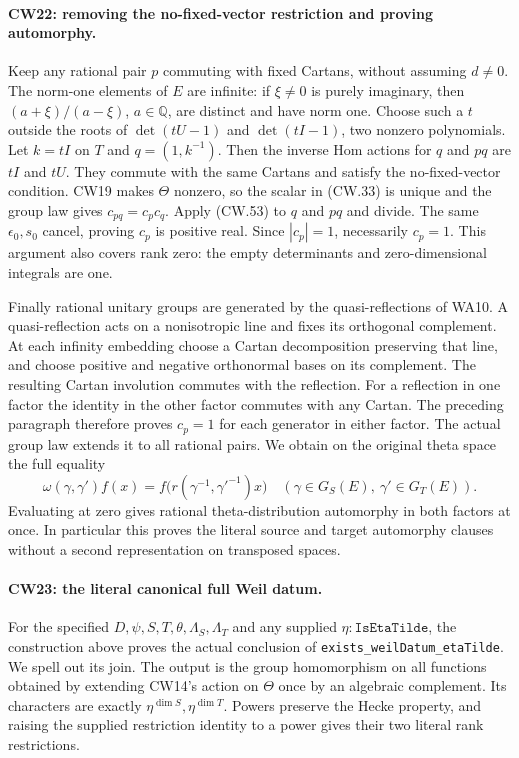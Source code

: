 \paragraph{CW22: removing the no-fixed-vector restriction and proving automorphy.}
Keep any rational pair $p$ commuting with fixed Cartans, without
assuming $d\ne0$.  The norm-one elements of $E$ are infinite:
if $\xi\ne0$ is purely imaginary, then
$(a+\xi)/(a-\xi)$, $a\in\mathbb Q$, are distinct and have norm
one.  Choose such a $t$ outside the roots of
$\det(tU-1)$ and $\det(tI-1)$, two nonzero polynomials.
Let $k=tI$ on $T$ and $q=(1,k^{-1})$.
Then the inverse Hom actions for $q$ and $pq$ are $tI$ and $tU$.
They commute with the same Cartans and satisfy the no-fixed-vector
condition.  CW19 makes $\Theta$ nonzero, so the scalar in (CW.33)
is unique and the group law gives $c_{pq}=c_pc_q$.
Apply (CW.53) to $q$ and $pq$ and divide.  The same
$\epsilon_0,s_0$ cancel, proving $c_p$ is positive real.
Since $|c_p|=1$, necessarily $c_p=1$.
This argument also covers rank zero: the empty determinants and
zero-dimensional integrals are one.

Finally rational unitary groups are generated by the
quasi-reflections of WA10.  A quasi-reflection acts on a
nonisotropic line and fixes its orthogonal complement.
At each infinity embedding choose a Cartan decomposition preserving
that line, and choose positive and negative orthonormal bases on
its complement.  The resulting Cartan involution commutes with
the reflection.  For a reflection in one factor the identity in
the other factor commutes with any Cartan.  The preceding paragraph
therefore proves $c_p=1$ for each generator in either factor.
The actual group law extends it to all rational pairs.  We obtain
on the original theta space the full equality
\[
       \omega(\gamma,\gamma')f(x)
                =f\bigl(r(\gamma^{-1},\gamma'^{-1})x\bigr)
       \quad(\gamma\in G_S(E),\ \gamma'\in G_T(E)).     \tag{CW.54}
\]
Evaluating at zero gives rational theta-distribution automorphy
in both factors at once.  In particular this proves the literal
source and target automorphy clauses without a second representation
on transposed spaces.

\paragraph{CW23: the literal canonical full Weil datum.}
For the specified $D,\psi,S,T,\theta,\Lambda_S,\Lambda_T$ and
any supplied $\eta:\texttt{IsEtaTilde}$, the construction above
proves the actual conclusion of
\texttt{exists\_weilDatum\_etaTilde}.  We spell out its join.
The output is the group homomorphism on all functions obtained
by extending CW14's action on $\Theta$ once by an algebraic
complement.  Its characters are exactly
$\eta^{\dim S},\eta^{\dim T}$.  Powers preserve the Hecke
property, and raising the supplied restriction identity to a
power gives their two literal rank restrictions.

